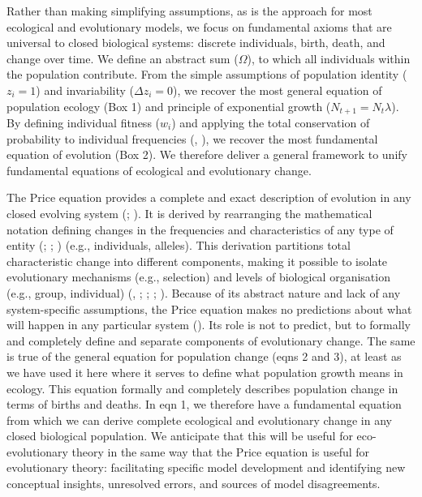 \documentclass[
]{article}
\begin{document}
Rather than making simplifying assumptions, as is the approach for most
ecological and evolutionary models, we focus on fundamental axioms that
are universal to closed biological systems: discrete individuals, birth,
death, and change over time. We define an abstract sum (\(\Omega\)), to
which all individuals within the population contribute. From the simple
assumptions of population identity (\(z_{i} = 1\)) and invariability
(\(\Delta z_{i} = 0\)), we recover the most general equation of
population ecology (Box 1) and principle of exponential growth
(\(N_{t+1} = N_{t}\lambda\)). By defining individual fitness (\(w_{i}\))
and applying the total conservation of probability to individual
frequencies (,
), we recover the most fundamental
equation of evolution (Box 2). We therefore deliver a general framework
to unify fundamental equations of ecological and evolutionary change.

The Price equation provides a complete and exact description of
evolution in any closed evolving system (; ). It is derived by
rearranging the mathematical notation defining changes in the
frequencies and characteristics of any type of entity
(;
; ) (e.g., individuals, alleles). This derivation partitions total
characteristic change into different components, making it possible to
isolate evolutionary mechanisms (e.g., selection) and levels of
biological organisation (e.g., group, individual)
(, ;
;
; ). Because of its abstract nature and lack of any
system-specific assumptions, the Price equation makes no predictions
about what will happen in any particular system
(). Its role is not to predict,
but to formally and completely define and separate components of
evolutionary change. The same is true of the general equation for
population change (eqns 2 and 3), at least as we have used it here where
it serves to define what population growth means in ecology. This
equation formally and completely describes population change in terms of
births and deaths. In eqn 1, we therefore have a fundamental equation
from which we can derive complete ecological and evolutionary change in
any closed biological population. We anticipate that this will be useful
for eco-evolutionary theory in the same way that the Price equation is
useful for evolutionary theory: facilitating specific model development
and identifying new conceptual insights, unresolved errors, and sources
of model disagreements.
\end{document}
